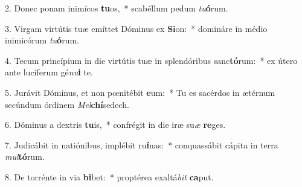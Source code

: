2. Donec ponam inimícos \textbf{tu}os,~*  scabéllum pedum \textit{tu}\textbf{ó}rum.\

3. Virgam virtútis tuæ emíttet Dóminus ex \textbf{Si}on:~*  domináre in médio inimicórum \textit{tu}\textbf{ó}rum.\

4. Tecum princípium in die virtútis tuæ in splendóribus sanc\textbf{tó}rum:~*  ex útero ante lucíferum gé\textit{nu}\textbf{i} te.\

5. Jurávit Dóminus, et non pœnitébit \textbf{e}um:~*  Tu es sacérdos in ætérnum secúndum órdinem \textit{Mel}\textbf{chí}sedech.\

6. Dóminus a dextris \textbf{tu}is,~*  confrégit in die iræ su\textit{æ} \textbf{re}ges.\

7. Judicábit in natiónibus, implébit ru\textbf{í}nas:~*  conquassábit cápita in terra \textit{mul}\textbf{tó}rum.\

8. De torrénte in via \textbf{bi}bet:~*  proptérea exaltá\textit{bit} \textbf{ca}put.\


